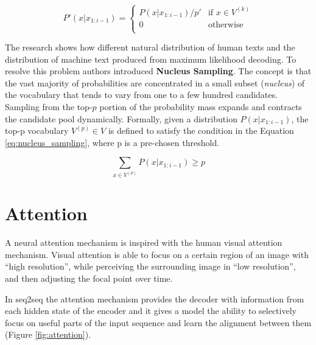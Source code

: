 \begin{equation} \label{eq:top_K_sampling}
P'(x|x_{1:i-1}) = \begin{cases} 
          P(x|x_{1:i-1}) / p' & \mbox{if $x \in V^{(k)}$} \\
          0 & \mbox{otherwise}\\
         \end{cases}
\end{equation}

The research \cite{holtzman2019curious} shows how different natural distribution of human texts and the distribution of machine text produced from maximum likelihood decoding. To resolve this problem authors introduced \textbf{Nucleus Sampling}. The concept is that the vast majority of probabilities are concentrated in a small subset (\textit{nucleus}) of the vocabulary that tends to vary from one to a few hundred candidates. Sampling from the top-$p$ portion of the probability mass expands and contracts the candidate pool dynamically. Formally, given a distribution $P(x|x_{1:i-1})$, the top-p vocabulary $V^{(p)} \in V$ is defined to satisfy the condition in the Equation \ref{eq:nucleus_sampling}, where p is a pre-chosen threshold.

\begin{equation} \label{eq:nucleus_sampling}
\sum_{x \in V^{(p)}} P(x|x_{1:i-1})  \geqslant p
\end{equation}

\section{Attention} \label{attention_section}
A neural attention mechanism is inspired with the human visual attention mechanism. Visual attention is able to focus on a certain region of an image with ``high resolution'', while perceiving the surrounding image in “low resolution”, and then adjusting the focal point over time.

In seq2seq the attention mechanism provides the decoder with information from each hidden state of the encoder and it gives a model the ability to selectively focus on useful parts of the input sequence and learn the alignment between them (Figure \ref{fig:attention}).

